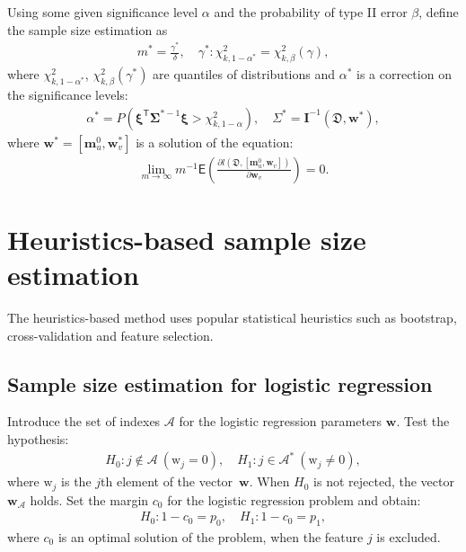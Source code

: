 \documentclass[
11pt,%
tightenlines,%
twoside,%
onecolumn,%
nofloats,%
nobibnotes,%
nofootinbib,%
superscriptaddress,%
noshowpacs,%
centertags]%
{revtex4}
\begin{document}
Using some given significance level $\alpha$ and the probability of type II error $\beta$, define the sample size estimation as
\begin{equation}
\label{eq:sb:18}
\begin{aligned}
	m^* = \frac{\gamma^*}{\delta}, \quad \gamma^*:\chi^2_{k, 1-\alpha^{*}} = \chi^2_{k, \beta}\left(\gamma\right),
\end{aligned}
\end{equation}
where $\chi^2_{k, 1-\alpha^*}$, $\chi^2_{k, \beta}\left(\gamma^*\right)$ are quantiles of distributions and $\alpha^*$ is a correction on the significance levels:
\begin{equation}
\label{eq:sb:19}
\begin{aligned}
	\alpha^* = P\left(\bm{\xi}^{\mathsf{T}}\bm{\Sigma}^{*-1} \bm{\xi} > \chi^2_{k,1 - \alpha}\right), \quad \Sigma^* = \textbf{I}^{-1}\left(\mathfrak{D}, \textbf{w}^*\right),
\end{aligned}
\end{equation}
where $\textbf{w}^{*} = \left[\textbf{m}_{u}^{0}, \textbf{w}^{*}_v\right]$  is a solution of the equation:
\begin{equation}
\label{eq:sb:20}
\begin{aligned}
	\lim_{m\to\infty}m^{-1}\mathsf{E}\left(\frac{\partial l\left(\mathfrak{D}, \left[ \textbf{m}_{u}^{0}, \textbf{w}_{v}\right]\right)}{\partial \textbf{w}_{v}}\right) = 0.
\end{aligned}
\end{equation}

\section{Heuristics-based sample size estimation}
The heuristics-based method uses popular statistical heuristics such as bootstrap, cross-validation and feature selection.
\subsection{Sample size estimation for logistic regression}
Introduce the set of indexes $\mathcal{A}$ for the logistic regression parameters $\textbf{w}$. Test the hypothesis:
\begin{equation}
\label{eq:hb:1}
\begin{aligned}
	H_0: j \not\in\mathcal{A}~\left(\text{w}_{j} = 0\right), \quad H_1: j \in \mathcal{A}^*~\left(\text{w}_{j} \not= 0\right),
\end{aligned}
\end{equation}
where $\text{w}_{j}$ is the $j$th element of the vector~$\textbf{w}$. When $H_0$ is not rejected, the vector $\textbf{w}_{\mathcal{A}}$ holds.
Set the margin $c_0$  for the logistic regression problem and obtain:
\begin{equation}
\label{eq:hb:2}
\begin{aligned}
	H_0: 1-c_0 = p_0, \quad H_1: 1-c_0 = p_1,
\end{aligned}
\end{equation}
where $c_0$ is an optimal solution of the problem, when the feature $j$ is excluded.
\end{document}
